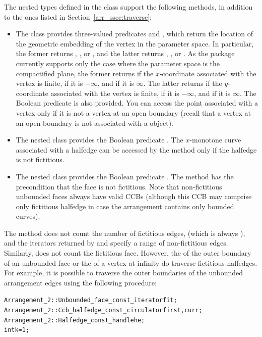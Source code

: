 \begin{ccAdvanced}
The nested types defined in the  class support the
following methods, in addition to the ones listed in
Section~\ref{arr_ssec:traverse}:
\begin{itemize}
\item
 The  class provides three-valued predicates
   and , which
  return the location of the geometric embedding of the vertex in the
  parameter space. In particular, the former returns
  , , or
  , and the latter returns
  , , or
  . As the package currently supports only the
  case where the parameter space is the compactified plane, the former
  returns  if the $x$-coordinate associated with the
  vertex is finite,  if it is $-\infty$, and
   if it is $\infty$. The latter returns
   if the $y$-coordinate associated with the vertex
  is finite,  if it is $-\infty$, and
   if it is $\infty$. The Boolean predicate
   is also provided. You can access the
  point associated with a vertex only if it is not a vertex at an open
  boundary (recall that a vertex at an open boundary is not associated
  with a  object).
%
\item
  The nested  class provides the Boolean predicate
  . The $x$-monotone curve associated with
  a halfedge can be accessed by the  method only if the
  halfedge is not fictitious.
%
\item
  The nested  class provides the Boolean predicate
  . The method  has the
  precondition that the face is not fictitious. Note that non-fictitious
  unbounded faces always have valid CCBs (although this CCB may
  comprise only fictitious halfedge in case the arrangement contains
  only bounded curves).
\end{itemize}

The method  does not count the number of
fictitious edges, (which is always
), and the iterators
returned by  and  specify
a range of non-fictitious edges. Similarly, 
does not count the fictitious face. However, the
 of the outer boundary of an
unbounded face or the  of a vertex
at infinity do traverse fictitious halfedges. For example, it is possible
to traverse the outer boundaries of the unbounded arrangement edges
using the following procedure:
\begin{alltt}
  Arrangement_2::Unbounded_face_const_iterator  fit;
  Arrangement_2::Ccb_halfedge_const_circulator  first, curr;
  Arrangement_2::Halfedge_const_handle          he;
  int                                           k = 1;


\end{alltt}
\end{ccAdvanced}
